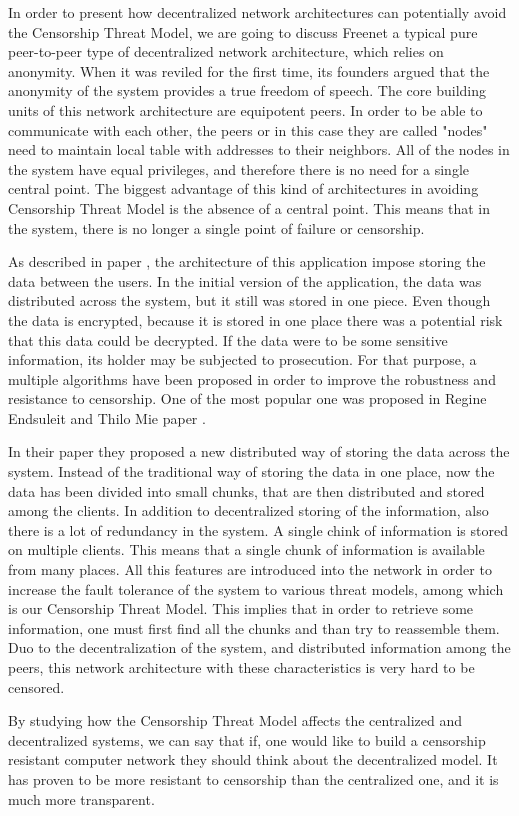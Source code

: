 In order to present how decentralized network architectures can potentially avoid the Censorship Threat Model, we are going to discuss Freenet \cite{clarke2001} a typical pure peer-to-peer \cite{web:peertopeer} type of decentralized network architecture, which relies on anonymity. When it was reviled for the first time, its founders argued that the anonymity of the system provides a true freedom of speech. The core building units of this network architecture are equipotent peers. In order to be able to communicate with each other, the peers or in this case they are called "nodes" need to maintain local table with addresses to their neighbors. All of the nodes in the system have equal privileges, and therefore there is no need for a single central point. The biggest advantage of this kind of architectures in avoiding Censorship Threat Model is the absence of a central point. This means that in the system, there is no longer a single point of failure or censorship.  

As described in paper \cite{clarke2001}, the architecture of this application impose storing the data between the users. In the initial version of the application, the data was distributed across the system, but it still was stored in one piece. Even though the data is encrypted, because it is stored in one place there was a potential risk that this data could be decrypted. If the data were to be some sensitive information, its holder may be subjected to prosecution. For that purpose, a multiple algorithms have been proposed in order to improve the robustness and resistance to censorship. One of the most popular one was proposed in Regine Endsuleit and Thilo Mie paper \cite{endsuleit2006}. 

In their paper they proposed a new distributed way of storing the data across the system. Instead of the traditional way of storing the data in one place, now the data has been divided into small chunks, that are then distributed and stored among the clients. In addition to decentralized storing of the information, also there is a lot of redundancy in the system. A single chink of information is stored on multiple clients. This means that a single chunk of information is available from many places. All this features are introduced into the network in order to increase the fault tolerance of the system to various threat models, among which is our Censorship Threat Model. This implies that in order to retrieve some information, one must first find all the chunks and than try to reassemble them. Duo to the decentralization of the system, and distributed information among the peers, this network architecture with these characteristics is very hard to be censored. 

By studying how the Censorship Threat Model affects the centralized and decentralized systems, we can say that if, one would like to build a censorship resistant computer network they should think about  the decentralized model. It has proven to be more resistant to censorship than the centralized one, and it is much more transparent. 
